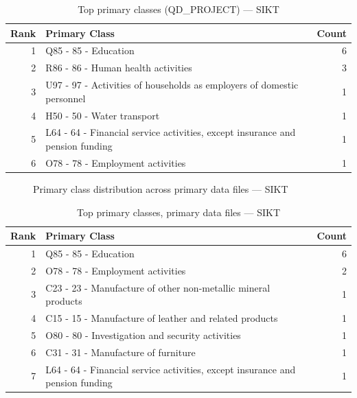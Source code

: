 \begin{table}[H]
    \centering
    \begin{tabular}{r p{10cm} r}
    \hline
    \textbf{Rank} & \textbf{Primary Class} & \textbf{Count} \\
    \hline
    1 & Q85 - 85 - Education & 6 \\
    2 & R86 - 86 - Human health activities & 3 \\
    3 & U97 - 97 - Activities of households as employers of domestic personnel & 1 \\
    4 & H50 - 50 - Water transport & 1 \\
    5 & L64 - 64 - Financial service activities, except insurance and pension funding & 1 \\
    6 & O78 - 78 - Employment activities & 1 \\
    \hline
    \end{tabular}
    \caption{Top primary classes (QD\_PROJECT) --- SIKT}
\end{table}

\clearpage

\begin{figure}[H]
    \centering
    
    \caption{Primary class distribution across primary data files --- SIKT}
\end{figure}

\begin{table}[H]
    \centering
    \begin{tabular}{r p{10cm} r}
    \hline
    \textbf{Rank} & \textbf{Primary Class} & \textbf{Count} \\
    \hline
    1 & Q85 - 85 - Education & 6 \\
    2 & O78 - 78 - Employment activities & 2 \\
    3 & C23 - 23 - Manufacture of other non-metallic mineral products & 1 \\
    4 & C15 - 15 - Manufacture of leather and related products & 1 \\
    5 & O80 - 80 - Investigation and security activities & 1 \\
    6 & C31 - 31 - Manufacture of furniture & 1 \\
    7 & L64 - 64 - Financial service activities, except insurance and pension funding & 1 \\
    \hline
    \end{tabular}
    \caption{Top primary classes, primary data files --- SIKT}
\end{table}


